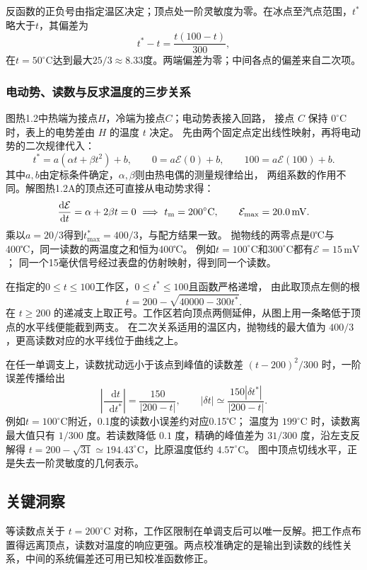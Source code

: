 \documentclass[UTF8,fontset=fandol,a4paper,11pt]{ctexart}
\newcommand{\dd}{\mathop{}\!\mathrm{d}}
\begin{document}
反函数的正负号由指定温区决定；顶点处一阶灵敏度为零。在冰点至汽点范围，$t^*$略大于$t$，其偏差为
\[t^*-t=\frac{t(100-t)}{300},\]
在$t=50^\circ\mathrm C$达到最大$25/3\approx8.33$度。两端偏差为零；中间各点的偏差来自二次项。
\subsubsection*{电动势、读数与反求温度的三步关系}
图热1.2中热端为接点$H$，冷端为接点$C$；电动势表接入回路，
接点 $C$ 保持 $0^\circ\mathrm C$ 时，表上的电势差由 $H$ 的温度 $t$ 决定。
先由两个固定点定出线性映射，再将电动势的二次规律代入：
\[
t^*=a(\alpha t+\beta t^2)+b,\qquad
0=a\mathcal E(0)+b,\qquad
100=a\mathcal E(100)+b.
\]
其中$a,b$由定标条件确定，$\alpha,\beta$则由热电偶的测量规律给出，
两组系数的作用不同。解图热1.2A的顶点还可直接从电动势求得：
\[
\frac{\dd\mathcal E}{\dd t}=\alpha+2\beta t=0
\ \Longrightarrow\ t_{\rm m}=200^\circ\mathrm C,\qquad
\mathcal E_{\max}=20.0\,\mathrm{mV}.
\]
乘以$a=20/3$得到$t^*_{\max}=400/3$，与配方结果一致。
抛物线的两零点是0℃与400℃，同一读数的两温度之和恒为400℃。
例如$t=100^\circ\mathrm C$和$300^\circ\mathrm C$都有$\mathcal E=15\,\mathrm{mV}$；
同一个15毫伏信号经过表盘的仿射映射，得到同一个读数。

在指定的$0\le t\le100$工作区，$0\le t^*\le100$且函数严格递增，
由此取顶点左侧的根
\[
t=200-\sqrt{40000-300t^*}.
\]
在 $t\ge200$ 的递减支上取正号。工作区若向顶点两侧延伸，从图上用一条略低于顶点的水平线便能截到两支。
在二次关系适用的温区内，抛物线的最大值为 $400/3$，更高读数对应的水平线位于曲线之上。

在任一单调支上，读数扰动远小于该点到峰值的读数差 $(t-200)^2/300$ 时，一阶误差传播给出
\[
\left|\frac{\dd t}{\dd t^*}\right|
=\frac{150}{|200-t|},\qquad
|\delta t|\simeq\frac{150|\delta t^*|}{|200-t|}.
\]
例如$t=100^\circ\mathrm C$附近，0.1度的读数小误差约对应0.15℃；
温度为 $199^\circ\mathrm C$ 时，读数离最大值只有 $1/300$ 度。若读数降低 $0.1$ 度，精确的峰值差为 $31/300$ 度，沿左支反解得 $t=200-\sqrt{31}\simeq194.43^\circ\mathrm C$，比原温度低约 $4.57^\circ\mathrm C$。
图中顶点切线水平，正是失去一阶灵敏度的几何表示。




\subsection*{关键洞察}

等读数点关于 $t=200^\circ\mathrm C$ 对称，工作区限制在单调支后可以唯一反解。把工作点布置得远离顶点，读数对温度的响应更强。两点校准确定的是输出到读数的线性关系，中间的系统偏差还可用已知校准函数修正。
\end{document}
